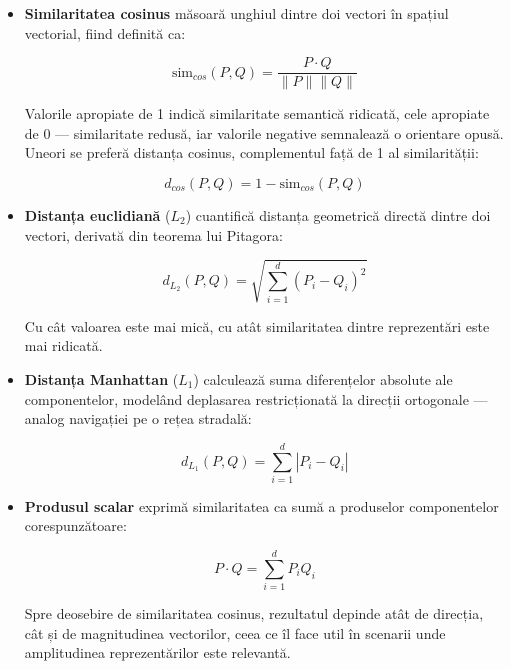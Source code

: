 \documentclass[12pt, a4paper, oneside, romanian]{teza-upb}
\begin{document}
\begin{itemize}
    \item \textbf{Similaritatea cosinus} măsoară unghiul dintre doi vectori în spațiul vectorial, fiind definită ca:

\begin{equation}
\text{sim}_{cos}(P, Q) = \frac{P \cdot Q}{\|P\| \|Q\|}
\end{equation}

Valorile apropiate de 1 indică similaritate semantică ridicată, cele apropiate de 0 — similaritate redusă, iar valorile negative semnalează o orientare opusă. Uneori se preferă distanța cosinus, complementul față de 1 al similarității:

\begin{equation}
d_{cos}(P, Q) = 1 - \text{sim}_{cos}(P, Q)
\end{equation}

    \item \textbf{Distanța euclidiană} ($L_2$) cuantifică distanța geometrică directă dintre doi vectori, derivată din teorema lui Pitagora:

\begin{equation}
d_{L_2}(P, Q) = \sqrt{\sum_{i=1}^{d} (P_i - Q_i)^2}
\end{equation}

Cu cât valoarea este mai mică, cu atât similaritatea dintre reprezentări este mai ridicată.

    \item \textbf{Distanța Manhattan} ($L_1$) calculează suma diferențelor absolute ale componentelor, modelând deplasarea restricționată la direcții ortogonale — analog navigației pe o rețea stradală:

\begin{equation}
d_{L_1}(P, Q) = \sum_{i=1}^{d} |P_i - Q_i|
\end{equation}

    \item \textbf{Produsul scalar} exprimă similaritatea ca sumă a produselor componentelor corespunzătoare:

\begin{equation}
P \cdot Q = \sum_{i=1}^{d} P_i Q_i
\end{equation}

Spre deosebire de similaritatea cosinus, rezultatul depinde atât de direcția, cât și de magnitudinea vectorilor, ceea ce îl face util în scenarii unde amplitudinea reprezentărilor este relevantă. \cite{levy2024similarity}

\end{itemize}
\end{document}
